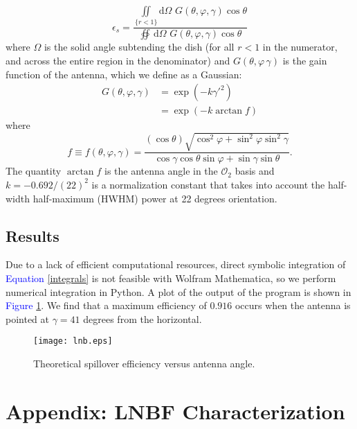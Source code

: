 \documentclass[11pt]{article}
\begin{document}
	\begin{equation}\label{integrals}
		\epsilon_s = \frac{\displaystyle\iint\limits_{\{r<1\}}\mathrm{d}\Omega\,\,G(\theta,\varphi,\gamma)\cos\theta}{\displaystyle\oiint\,\mathrm{d}\Omega\,\,G(\theta,\varphi,\gamma)\cos\theta}
	\end{equation}
where $\Omega$ is the solid angle subtending the dish (for all $r<1$ in the numerator, and across the entire region in the denominator) and $G(\theta,\varphi\,\gamma)$ is the gain function of the antenna, which we define as a Gaussian:
	\begin{align}
		G(\theta,\varphi,\gamma) &= \exp\left(-k\gamma'^2\right) \\
		&= \exp\left(-k\arctan f\right)
	\end{align}
where 
\begin{equation}
	f\equiv f(\theta,\varphi,\gamma) = \frac{(\cos\theta)\sqrt{\cos^2\varphi+\sin^2\varphi\sin^2\gamma}}{\cos\gamma\cos\theta\sin\varphi+\sin\gamma\sin\theta}.
\end{equation}
The quantity $\arctan f$ is the antenna angle in the $\mathcal{O}_2$ basis and $k=-0.692/(22)^2$ is a normalization constant that takes into account the half-width half-maximum (HWHM) power at 22 degrees orientation.
\subsection{Results}
Due to a lack of efficient computational resources, direct symbolic integration of \textcolor{blue}{Equation} \ref{integrals} is not feasible with Wolfram Mathematica, so we perform numerical integration in Python. A plot of the output of the program is shown in \textcolor{blue}{Figure} \ref{LNBTEST}. We find that a maximum efficiency of $0.916$ occurs when the antenna is pointed at $\gamma=41$ degrees from the horizontal. 
	\begin{figure}[t]
		\centering
	\texttt{[image: lnb.eps]}
		\caption{Theoretical spillover efficiency versus antenna angle.}
		\label{LNBTEST}
	\end{figure}	
\section{Appendix: LNBF Characterization}\label{LNBAP}
\end{document}

